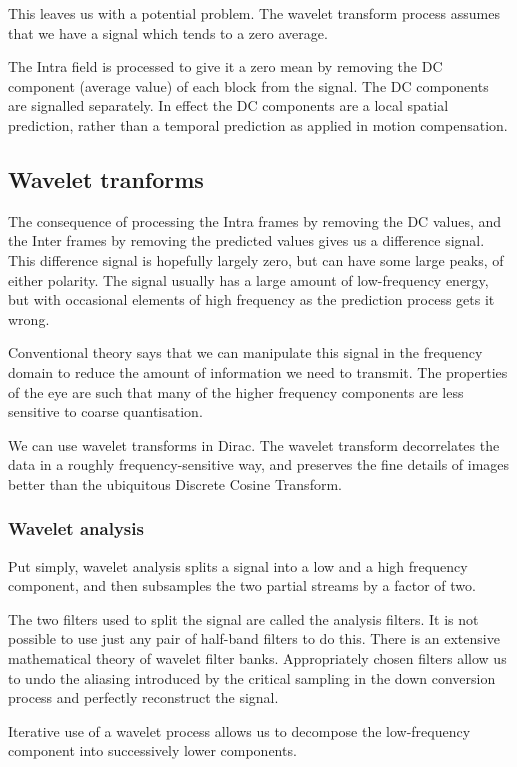 This leaves us with a potential problem. The wavelet transform process
assumes that we have a signal which tends to a zero average.

The Intra field is processed to give it a zero mean by removing the DC
component (average value) of each block from the signal. The DC
components are signalled separately. In effect the DC components are a
local spatial prediction, rather than a temporal prediction as applied
in motion compensation.

\subsection{Wavelet tranforms}
The consequence of processing the Intra frames by removing the DC
values, and the Inter frames by removing the predicted values gives us a
difference signal. This difference signal is hopefully largely zero, but
can have some large peaks, of either polarity. The signal usually has a
large amount of low-frequency energy, but with occasional elements of
high frequency as the prediction process gets it wrong.

Conventional theory says that we can manipulate this signal in the
frequency domain to reduce the amount of information we need to
transmit. The properties of the eye are such that many of the higher
frequency components are less sensitive to coarse quantisation.

We can use wavelet transforms in Dirac. The wavelet transform
decorrelates the data in a roughly frequency-sensitive way, and
preserves the fine details of images better than the ubiquitous Discrete
Cosine Transform.

\subsubsection{Wavelet analysis}

Put simply, wavelet analysis splits a signal into a low and a high
frequency component, and then subsamples the two partial streams by a
factor of two.

The two filters used to split the signal are called the analysis
filters. It is not possible to use just any pair of half-band filters to
do this. There is an extensive mathematical theory of wavelet filter
banks. Appropriately chosen filters allow us to undo the aliasing
introduced by the critical sampling in the down conversion process and
perfectly reconstruct the signal.

Iterative use of a wavelet process allows us to decompose the
low-frequency component into successively lower components.

